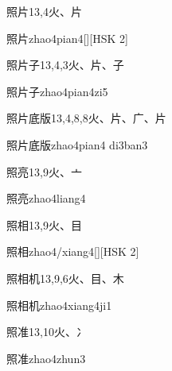 \begin{Entry}{照片}{13,4}{⽕、⽚}
  \begin{Phonetics}{照片}{zhao4pian4}[][HSK 2]
  \end{Phonetics}
\end{Entry}

\begin{Entry}{照片子}{13,4,3}{⽕、⽚、⼦}
  \begin{Phonetics}{照片子}{zhao4pian4zi5}
  \end{Phonetics}
\end{Entry}

\begin{Entry}{照片底版}{13,4,8,8}{⽕、⽚、⼴、⽚}
  \begin{Phonetics}{照片底版}{zhao4pian4 di3ban3}
  \end{Phonetics}
\end{Entry}

\begin{Entry}{照亮}{13,9}{⽕、⼇}
  \begin{Phonetics}{照亮}{zhao4liang4}
  \end{Phonetics}
\end{Entry}

\begin{Entry}{照相}{13,9}{⽕、⽬}
  \begin{Phonetics}{照相}{zhao4/xiang4}[][HSK 2]
  \end{Phonetics}
\end{Entry}

\begin{Entry}{照相机}{13,9,6}{⽕、⽬、⽊}
  \begin{Phonetics}{照相机}{zhao4xiang4ji1}
  \end{Phonetics}
\end{Entry}

\begin{Entry}{照准}{13,10}{⽕、⼎}
  \begin{Phonetics}{照准}{zhao4zhun3}
  \end{Phonetics}
\end{Entry}

